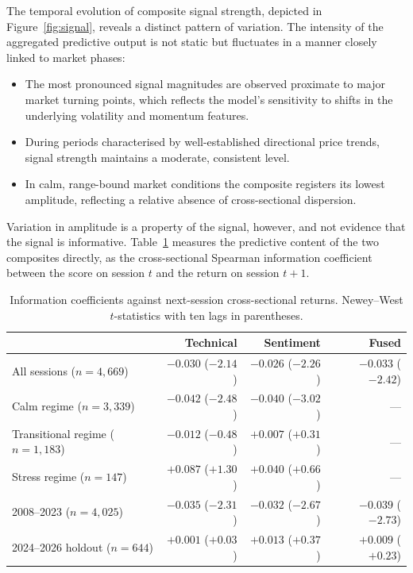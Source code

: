 \documentclass{singlecol-new}
\theoremstyle{TH}{
\newtheorem{lemma}{Lemma}
\newtheorem{theorem}[lemma]{Theorem}
\newtheorem{corrolary}[lemma]{Corrolary}
\newtheorem{conjecture}[lemma]{Conjecture}
\newtheorem{proposition}[lemma]{Proposition}
\newtheorem{claim}[lemma]{Claim}
\newtheorem{stheorem}[lemma]{Wrong Theorem}
\newtheorem{algorithm}{Algorithm}
}
\theoremstyle{THrm}{
\newtheorem{definition}{Definition}[section]
\newtheorem{question}{Question}[section]
\newtheorem{remark}{Remark}
\newtheorem{scheme}{Scheme}
}
\theoremstyle{THhit}{
\newtheorem{case}{Case}[section]
}
\begin{document}
The temporal evolution of composite signal strength, depicted in
Figure~\ref{fig:signal}, reveals a distinct pattern of variation. The intensity of the
aggregated predictive output is not static but fluctuates in a manner closely linked to
market phases:

\begin{itemize}
\item The most pronounced signal magnitudes are observed proximate to major market
turning points, which reflects the model's sensitivity to shifts in the underlying
volatility and momentum features.
\item During periods characterised by well-established directional price trends, signal
strength maintains a moderate, consistent level.
\item In calm, range-bound market conditions the composite registers its lowest
amplitude, reflecting a relative absence of cross-sectional dispersion.
\end{itemize}

Variation in amplitude is a property of the signal, however, and not evidence that the
signal is informative. Table~\ref{tab:ic} measures the predictive content of the two
composites directly, as the cross-sectional Spearman information coefficient between the
score on session $t$ and the return on session $t+1$.

\begin{table}[!ht]
\centering
\caption{Information coefficients against next-session cross-sectional returns.
Newey--West $t$-statistics with ten lags in parentheses.}
\label{tab:ic}
\footnotesize
\begin{tabular}{p{3.8cm}rrr}
\hline
& \textbf{Technical} & \textbf{Sentiment} & \textbf{Fused} \\
\hline
All sessions ($n=4{,}669$) & $-0.030$ ($-2.14$) & $-0.026$ ($-2.26$) & $-0.033$ ($-2.42$) \\
Calm regime ($n=3{,}339$) & $-0.042$ ($-2.48$) & $-0.040$ ($-3.02$) & --- \\
Transitional regime ($n=1{,}183$) & $-0.012$ ($-0.48$) & $+0.007$ ($+0.31$) & --- \\
Stress regime ($n=147$) & $+0.087$ ($+1.30$) & $+0.040$ ($+0.66$) & --- \\
\hline
2008--2023 ($n=4{,}025$) & $-0.035$ ($-2.31$) & $-0.032$ ($-2.67$) & $-0.039$ ($-2.73$) \\
2024--2026 holdout ($n=644$) & $+0.001$ ($+0.03$) & $+0.013$ ($+0.37$) & $+0.009$ ($+0.23$) \\
\hline
\end{tabular}
\end{table}
\end{document}

